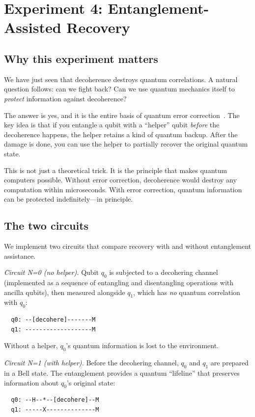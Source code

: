 \documentclass[amsmath,amssymb,reprint,aps,prb]{revtex4-2}
\begin{document}
\section{Experiment 4: Entanglement-Assisted Recovery}
\label{sec:recovery}

\subsection{Why this experiment matters}

We have just seen that decoherence destroys quantum correlations.
A natural question follows: can we fight back?  Can we use quantum
mechanics itself to \emph{protect} information against decoherence?

The answer is yes, and it is the entire basis of quantum error
correction~\cite{Shor1995,Steane1996,Knill1997}.  The key idea is
that if you entangle a qubit with a ``helper'' qubit \emph{before}
the decoherence happens, the helper retains a kind of quantum
backup.  After the damage is done, you can use the helper to
partially recover the original quantum state.

This is not just a theoretical trick.  It is the principle that
makes quantum computers possible.  Without error correction,
decoherence would destroy any computation within microseconds.
With error correction, quantum information can be protected
indefinitely---in principle.

\subsection{The two circuits}

We implement two circuits that compare recovery with and without
entanglement assistance.

\textit{Circuit N=0 (no helper).}  Qubit $q_0$ is subjected to
a decohering channel (implemented as a sequence of entangling and
disentangling operations with ancilla qubits), then measured
alongside $q_1$, which has \emph{no} quantum correlation with
$q_0$:
\begin{verbatim}
  q0: --[decohere]-------M
  q1: -------------------M
\end{verbatim}
Without a helper, $q_0$'s quantum information is lost to the
environment.

\textit{Circuit N=1 (with helper).}  Before the decohering channel,
$q_0$ and $q_1$ are prepared in a Bell state.  The entanglement
provides a quantum ``lifeline'' that preserves information about
$q_0$'s original state:
\begin{verbatim}
  q0: --H--*--[decohere]--M
  q1: -----X--------------M
\end{verbatim}
\end{document}
